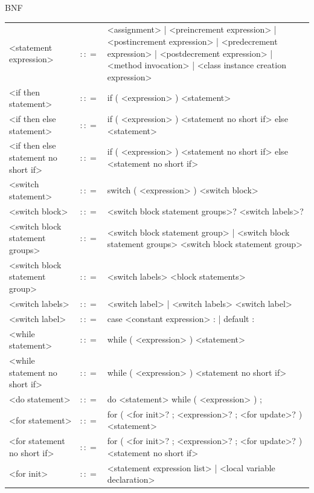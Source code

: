 \documentclass[landscape, 11pt]{article}
\begin{document}
\begin{qsection}{BNF}
\begin{enumerate}[label=\bt{\theenumi.}]
\begin{longtable}{R{7cm} c L{15cm}}
				\\
				<statement expression>						&	$\colon\colon=$	&	<assignment> | <preincrement expression> | <postincrement expression> | <predecrement expression> | <postdecrement expression> | <method invocation> | <class instance creation expression>
				\\
				<if then statement>							&	$\colon\colon=$	&	if ( <expression> ) <statement>
				\\
				<if then else statement>					&	$\colon\colon=$	&	if ( <expression> ) <statement no short if> else <statement>
				\\
				<if then else statement no short if>		&	$\colon\colon=$	&	if ( <expression> ) <statement no short if> else <statement no short if>
				\\
				<switch statement>							&	$\colon\colon=$	&	switch ( <expression> ) <switch block>
				\\
				<switch block>								&	$\colon\colon=$	&	{ <switch block statement groups>? <switch labels>? }
				\\
				<switch block statement groups>				&	$\colon\colon=$	&	<switch block statement group> | <switch block statement groups> <switch block statement group>
				\\
				<switch block statement group>				&	$\colon\colon=$	&	<switch labels> <block statements>
				\\
				<switch labels>								&	$\colon\colon=$	&	<switch label> | <switch labels> <switch label>
				\\
				<switch label>								&	$\colon\colon=$	&	case <constant expression> : | default :
				\\
				<while statement>							&	$\colon\colon=$	&	while ( <expression> ) <statement>
				\\
				<while statement no short if>				&	$\colon\colon=$	&	while ( <expression> ) <statement no short if>
				\\
				<do statement>								&	$\colon\colon=$	&	do <statement> while ( <expression> ) ;
				\\
				<for statement>								&	$\colon\colon=$	&	for ( <for init>? ; <expression>? ; <for update>? ) <statement>
				\\
				<for statement no short if>					&	$\colon\colon=$	&	for ( <for init>? ; <expression>? ; <for update>? ) <statement no short if>
				\\
				<for init>									&	$\colon\colon=$	&	<statement expression list> | <local variable declaration>
				\\

\end{longtable}
\end{enumerate}
\end{qsection}
\end{document}
